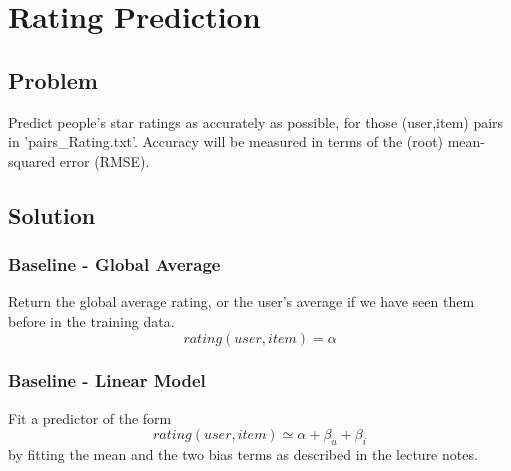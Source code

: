 \documentclass[a4paper]{article}
\begin{document}
\newpage

\section{Rating Prediction}
\label{sec:rating}

\subsection{Problem}
Predict people's star ratings as accurately as possible, for those (user,item) pairs in 'pairs\_Rating.txt'. Accuracy will be measured in terms of the (root) mean-squared error (RMSE).

\subsection{Solution}
\subsubsection{Baseline - Global Average}
Return the global average rating, or the user's average if we have seen them before in the training data.
\begin{equation}
rating(user, item) = \alpha
\end{equation}

\subsubsection{Baseline - Linear Model}
Fit a predictor of the form
\begin{equation}
rating(user, item) \simeq \alpha + \beta_{u} + \beta_{i}
\end{equation}
by fitting the mean and the two bias terms as described in the lecture notes.
\end{document}
